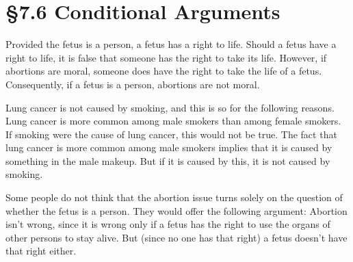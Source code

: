 % 
% 

\section{\S 7.6 Conditional Arguments}
\begin{enumerate}

\begin{statement}{Provided the fetus is a person, a fetus has a right to life. Should a fetus
 have a right to life, it is false that someone has the right to take its
 life. However, if abortions are moral, someone does have the right to
 take the life of a fetus. Consequently, if a fetus is a person, abortions
 are not moral.
}
\end{statement}

\begin{statement}{Lung cancer is not caused by smoking, and this is so for the
    following reasons. Lung cancer is more common among male smokers than among
    female smokers. If smoking were the cause of lung cancer, this would not be
    true. The fact that lung cancer is more common among male smokers implies
    that it is caused by something in the male makeup. But if it is caused by
    this, it is not caused by smoking. }
\end{statement}

\begin{statement}
    {Some people do not think that the abortion issue turns solely on the
    question of whether the fetus is a person. They would offer the following
    argument: Abortion isn't wrong, since it is wrong only if a fetus has the
    right to use the organs of other persons to stay alive. But (since no one
    has that right) a fetus doesn't have that right either.}
\end{statement}


\end{enumerate}
